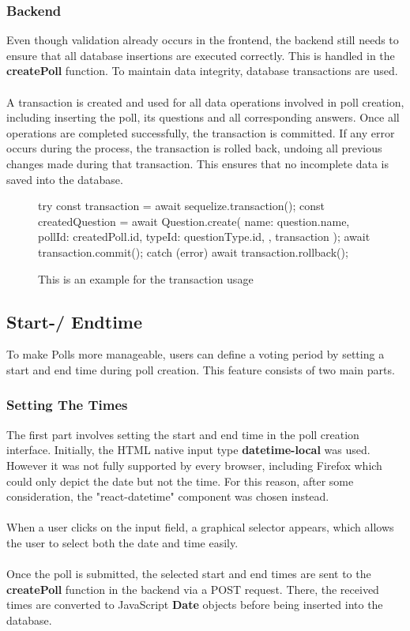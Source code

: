 \documentclass[a4paper,12pt]{report}
\begin{document}
\subsubsection{Backend}
Even though validation already occurs in the frontend, the backend still needs to ensure that all database insertions are executed correctly. This is handled in the \textbf{createPoll} function. To maintain data integrity, database transactions are used.\\\\
A transaction is created and used for all data operations involved in poll creation, including inserting the poll, its questions and all corresponding answers. Once all operations are completed successfully, the transaction is committed. If any error occurs during the process, the transaction is rolled back, undoing all previous changes made during that transaction. This ensures that no incomplete data is saved into the database.
\begin{figure}[H]
	\begin{code}
		try {
			const transaction = await sequelize.transaction();
			const createdQuestion = await Question.create({
				name: question.name,
				pollId: createdPoll.id,
				typeId: questionType.id,
			}, { transaction });
			await transaction.commit();
		} catch (error) {
			await transaction.rollback();
		}
	\end{code}
	\caption{This is an example for the transaction usage}
	\label{fig:example-transaction}
\end{figure} 
\subsection{Start-/ Endtime}
To make Polls more manageable, users can define a voting period by setting a start and end time during poll creation. This feature consists of two main parts.
\subsubsection{Setting The Times}
The first part involves setting the start and end time in the poll creation interface. Initially, the HTML native input type \textbf{datetime-local} was used. However it was not fully supported by every browser, including Firefox which could only depict the date but not the time. For this reason, after some consideration, the "react-datetime" component was chosen instead.\\\\
When a user clicks on the input field, a graphical selector appears, which allows the user to select both the date and time easily.\\\\
Once the poll is submitted, the selected start and end times are sent to the \textbf{createPoll} function in the backend via a POST request. There, the received times are converted to JavaScript \textbf{Date} objects before being inserted into the database.
\end{document}
